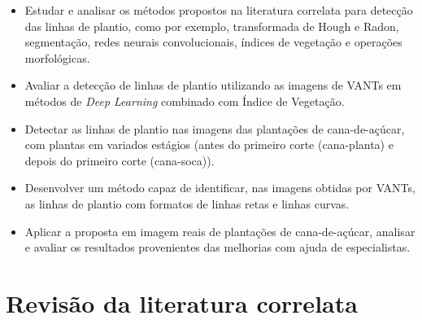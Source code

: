 \documentclass[12pt, a4paper, english, brazil]{article}
\begin{document}
\begin{itemize}
    \item Estudar e analisar os métodos propostos na literatura correlata para detecção das linhas de plantio, como por exemplo, transformada de Hough e Radon, segmentação, redes neurais convolucionais, índices de vegetação e operações morfológicas.

    \item Avaliar a detecção de linhas de plantio utilizando as imagens de VANTs em métodos de \textit{Deep Learning} combinado com Índice de Vegetação.

    \item Detectar as linhas de plantio nas imagens das plantações de cana-de-açúcar, com plantas em variados estágios (antes do primeiro corte (cana-planta) e depois do primeiro corte (cana-soca)).

    \item Desenvolver um método capaz de identificar, nas imagens obtidas por VANTs, as linhas de plantio com formatos de linhas retas e linhas curvas.

    \item Aplicar a proposta em imagem reais de plantações de cana-de-açúcar, analisar e avaliar os resultados provenientes das melhorias com ajuda de especialistas.
\end{itemize}



\section{Revisão da literatura correlata}
\end{document}
